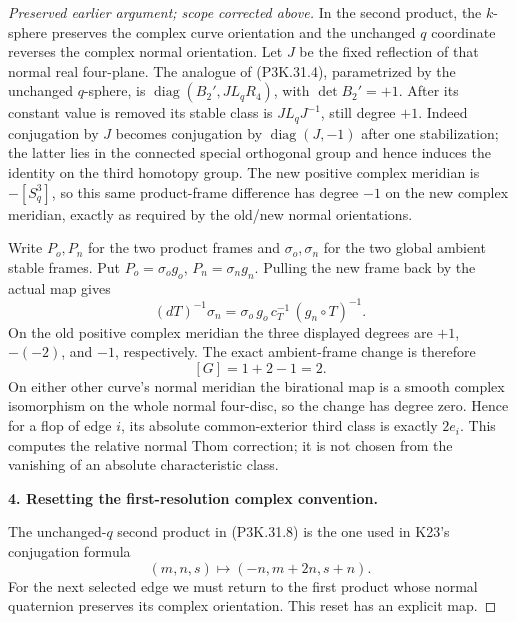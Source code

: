 \begin{proof}[Preserved earlier argument; scope corrected above]
In the second product, the \(k\)-sphere preserves the
complex curve orientation and the unchanged \(q\)
coordinate reverses the complex normal orientation.
Let \(J\) be the fixed reflection of that normal real
four-plane. The analogue of (P3K.31.4), parametrized by
the unchanged \(q\)-sphere, is
\(\operatorname{diag}(B_2',J L_qR_4)\), with
\(\det B_2'=+1\).
After its constant value is removed its stable class
is \(J L_qJ^{-1}\), still degree \(+1\).
Indeed conjugation by \(J\) becomes conjugation by
\(\operatorname{diag}(J,-1)\) after one stabilization;
the latter lies in the connected special orthogonal
group and hence induces the identity on the third
homotopy group. The new positive complex meridian is
\(-[S^3_q]\), so this same product-frame difference has
degree \(-1\) on the new complex meridian, exactly as
required by the old/new normal orientations.

Write \(P_o,P_n\) for the two product frames and
\(\sigma_o,\sigma_n\) for the two global ambient stable
frames. Put \(P_o=\sigma_og_o\), \(P_n=\sigma_ng_n\).
Pulling the new frame back by the actual map gives
\[
 (dT)^{-1}\sigma_n
       =\sigma_o\,g_o\,c_T^{-1}\,(g_n\circ T)^{-1}.
                                                        \tag{P3K.31.10}
\]
On the old positive complex meridian the three displayed
degrees are \(+1\), \(-(-2)\), and \(-1\), respectively.
The exact ambient-frame change is therefore
\[
                         [G]=1+2-1=2.
                                                        \tag{P3K.31.11}
\]
On either other curve's normal meridian the birational
map is a smooth complex isomorphism on the whole normal
four-disc, so the change has degree zero. Hence for a
flop of edge \(i\), its absolute common-exterior third
class is exactly \(2e_i\). This computes the relative
normal Thom correction; it is not chosen from the
vanishing of an absolute characteristic class.

\par\medskip\noindent\textbf{4. Resetting the first-resolution complex convention.}\enspace

The unchanged-\(q\) second product in (P3K.31.8) is the one
used in K23's conjugation formula
\[
             (m,n,s)\longmapsto(-n,m+2n,s+n).
                                                        \tag{P3K.31.12}
\]
For the next selected edge we must return to the first
product whose normal quaternion preserves its complex
orientation. This reset has an explicit map.


\end{proof}
